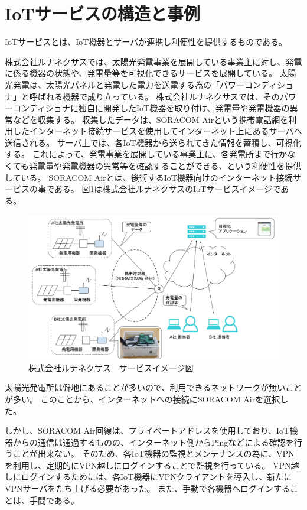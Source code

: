 \section{IoTサービスの構造と事例}
IoTサービスとは、IoT機器とサーバが連携し利便性を提供するものである。

株式会社ルナネクサスでは、太陽光発電事業を展開している事業主に対し、発電に係る機器の状態や、発電量等を可視化できるサービスを展開している。
太陽光発電は、太陽光パネルと発電した電力を送電する為の「パワーコンディショナ」と呼ばれる機器で成り立っている。
株式会社ルナネクサスでは、そのパワーコンディショナに独自に開発したIoT機器を取り付け、発電量や発電機器の異常などを収集する。
収集したデータは、SORACOM Airという携帯電話網を利用したインターネット接続サービスを使用してインターネット上にあるサーバへ送信される。
サーバ上では、各IoT機器から送られてきた情報を蓄積し、可視化する。
これによって、発電事業を展開している事業主に、各発電所まで行かなくても発電量や発電機器の異常等を確認することができる、という利便性を提供している。
SORACOM Airとは、後術するIoT機器向けのインターネット接続サービスの事である。
図\ref{fig:lunafig}は株式会社ルナネクサスのIoTサービスイメージである。
\begin{figure}[htbp]
\includegraphics[width=16cm]{images/lunafig.png}
\caption{株式会社ルナネクサス　サービスイメージ図}
\label{fig:lunafig}
\end{figure}
太陽光発電所は僻地にあることが多いので、利用できるネットワークが無いことが多い。
このことから、インターネットへの接続にSORACOM Airを選択した。

しかし、SORACOM Air回線は、プライベートアドレスを使用しており、IoT機器からの通信は通過するものの、インターネット側からPingなどによる確認を行うことが出来ない。
そのため、各IoT機器の監視とメンテナンスの為に、VPNを利用し、定期的にVPN越しにログインすることで監視を行っている。
VPN越しにログインするためには、各IoT機器にVPNクライアントを導入し、新たにVPNサーバをたち上げる必要があった。
また、手動で各機器へログインすることは、手間である。

